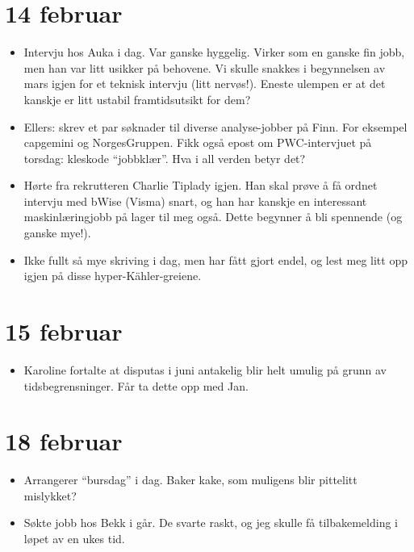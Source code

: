 \documentclass[11pt, norsk]{article}
\begin{document}

\section{14 februar} %
\label{sec:14_februar}

\begin{itemize}
  \item Intervju hos Auka i dag. Var ganske hyggelig. Virker som en ganske fin jobb, men han var litt usikker på behovene. Vi skulle snakkes i begynnelsen av mars igjen for et teknisk intervju (litt nervøs!). Eneste ulempen er at det kanskje er litt ustabil framtidsutsikt for dem?
  \item Ellers: skrev et par søknader til diverse analyse-jobber på Finn. For eksempel capgemini og NorgesGruppen. Fikk også epost om PWC-intervjuet på torsdag: kleskode ``jobbklær''. Hva i all verden betyr det?
  \item Hørte fra rekrutteren Charlie Tiplady igjen. Han skal prøve å få ordnet intervju med bWise (Visma) snart, og han har kanskje en interessant maskinlæringjobb på lager til meg også. Dette begynner å bli spennende (og ganske mye!).
  \item Ikke fullt så mye skriving i dag, men har fått gjort endel, og lest meg litt opp igjen på disse hyper-Kähler-greiene.
\end{itemize}


\section{15 februar} %
\label{sec:15_februar}

\begin{itemize}
  \item Karoline fortalte at disputas i juni antakelig blir helt umulig på grunn av tidsbegrensninger. Får ta dette opp med Jan.
\end{itemize}

\section{18 februar} %
\label{sec:18_februar}

\begin{itemize}
  \item Arrangerer ``bursdag'' i dag. Baker kake, som muligens blir pittelitt mislykket?
  \item Søkte jobb hos Bekk i går. De svarte raskt, og jeg skulle få tilbakemelding i løpet av en ukes tid. 
\end{itemize}
\end{document}
